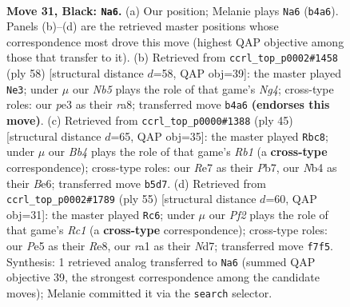 \documentclass[11pt]{article}
\begin{document}
\clearpage

\begin{figure}[p]\centering
\begin{subfigure}{0.46\textwidth}\centering
\resizebox{\linewidth}{!}{%
\newchessgame
\chessboard[
  setfen={r5k1/4rppp/1n6/pb2p1P1/1n2N3/1P2P1R1/P5PP/RN1B3K b - - 1 31},
  showmover=false,
  pgfstyle=straightmove, color=movearrow, markmove={b4-a6}
]}
\caption{}
\end{subfigure}\hfill
\begin{subfigure}{0.46\textwidth}\centering
\resizebox{\linewidth}{!}{%
\newchessgame
\chessboard[
  setfen={r2b3k/5rp1/1n2pp1p/1P6/p2PP1N1/3R2BP/5PP1/2R3K1 w - - 1 30},
  showmover=false,
  pgfstyle=straightmove, color=movearrow, markmove={g4-e3}
]}
\caption{}
\end{subfigure}
\\[4pt]
\begin{subfigure}{0.46\textwidth}\centering
\resizebox{\linewidth}{!}{%
\newchessgame
\chessboard[
  setfen={1r1r2k1/1p3p1p/p3bnp1/4p3/P3P3/1PN3PP/2P2PB1/R3R1K1 b - - 0 23},
  showmover=false,
  pgfstyle=straightmove, color=movearrow, markmove={b8-c8}
]}
\caption{}
\end{subfigure}\hfill
\begin{subfigure}{0.46\textwidth}\centering
\resizebox{\linewidth}{!}{%
\newchessgame
\chessboard[
  setfen={2r1r3/p2n1kp1/3bp2p/2p5/2Pp1P2/1P1N2P1/P2B2KP/R4R2 b - - 1 28},
  showmover=false,
  pgfstyle=straightmove, color=movearrow, markmove={c8-c6}
]}
\caption{}
\end{subfigure}
\caption{\textbf{Move 31, Black: \texttt{Na6}.} (a) Our position; Melanie plays \texttt{Na6} (\texttt{b4a6}). Panels (b)--(d) are the retrieved master positions whose correspondence most drove this move (highest QAP objective among those that transfer to it). (b) Retrieved from \texttt{ccrl\_top\_p0002\#1458} (ply 58) [structural distance $d$=58, QAP obj=39]: the master played \texttt{Ne3}; under $\mu$ our \emph{Nb5} plays the role of that game's \emph{Ng4}; cross-type roles: our \emph{p}e3 as their \emph{r}a8; transferred move \texttt{b4a6} \textbf{(endorses this move)}. (c) Retrieved from \texttt{ccrl\_top\_p0000\#1388} (ply 45) [structural distance $d$=65, QAP obj=35]: the master played \texttt{Rbc8}; under $\mu$ our \emph{Bb4} plays the role of that game's \emph{Rb1} (a \textbf{cross-type} correspondence); cross-type roles: our \emph{R}e7 as their \emph{P}b7, our \emph{N}b4 as their \emph{B}e6; transferred move \texttt{b5d7}. (d) Retrieved from \texttt{ccrl\_top\_p0002\#1789} (ply 55) [structural distance $d$=60, QAP obj=31]: the master played \texttt{Rc6}; under $\mu$ our \emph{Pf2} plays the role of that game's \emph{Rc1} (a \textbf{cross-type} correspondence); cross-type roles: our \emph{P}e5 as their \emph{R}e8, our \emph{r}a1 as their \emph{N}d7; transferred move \texttt{f7f5}. Synthesis: 1 retrieved analog transferred to \texttt{Na6} (summed QAP objective 39, the strongest correspondence among the candidate moves); Melanie committed it via the \texttt{search} selector.}
\label{fig:thought-m61}
\end{figure}
\end{document}
